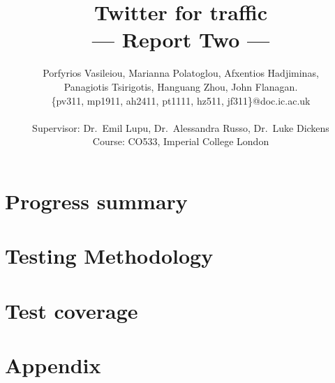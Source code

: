 \documentclass[a4paper,11pt]{article}
\title{Twitter for traffic\\\Large{--- Report Two ---}}
\author{Porfyrios Vasileiou, Marianna Polatoglou, Afxentios Hadjiminas,\\
        Panagiotis Tsirigotis, Hanguang Zhou, John Flanagan.\\
       \{pv311, mp1911, ah2411, pt1111, hz511, jf311\}@doc.ic.ac.uk\\ \\
       \small{Supervisor: Dr.\ Emil Lupu, Dr.\ Alessandra Russo, Dr.\ Luke Dickens}\\
       \small{Course: CO533, Imperial College London}
}
\begin{document}
\maketitle

\section{Progress summary}
	

\section{Testing Methodology}
	

\section{Test coverage}
	

\section{Appendix}
	
%	
%	
\end{document}
